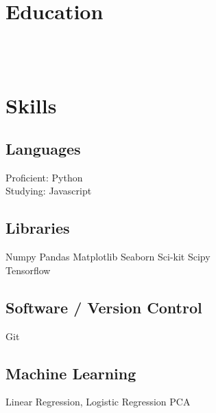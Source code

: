 \documentclass[]{charan}
\begin{document}
\section{Education}
 \\
\sectionsep
{} \\
\vspace{0.3em}


\section{Skills}
\vspace{-.8em}
\begin{minipage}[t]{0.35\textwidth}
\subsection{Languages}
Proficient: Python \\
Studying: Javascript
\end{minipage}
\hfill
\begin{minipage}[t]{.6\textwidth}
\subsection{Libraries}
Numpy \textbullet{} Pandas \textbullet{} Matplotlib \textbullet{}Seaborn \textbullet{} Sci-kit \textbullet{} Scipy \\
\textbullet{} Tensorflow
\end{minipage}

\vspace{.8em}
\begin{minipage}[t]{.35\textwidth}
\subsection{Software / Version Control}
Git
\end{minipage}
\hfill
\begin{minipage}[t]{.6\textwidth}
\subsection{Machine Learning}
Linear Regression, \textbullet{} Logistic Regression \textbullet{} PCA
\end{minipage}
\hfill
\end{document}
